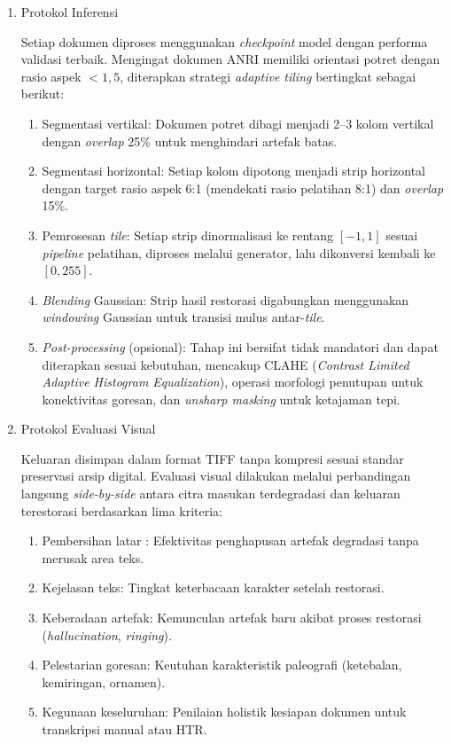 \begin{enumerate}[leftmargin=1.5em, labelsep=0.5em, itemindent=0pt, label=\arabic*., topsep=0pt, partopsep=0pt]
    \item Protokol Inferensi

    Setiap dokumen diproses menggunakan \textit{checkpoint} model dengan performa validasi terbaik. Mengingat dokumen ANRI memiliki orientasi potret dengan rasio aspek $< 1{,}5$, diterapkan strategi \textit{adaptive tiling} bertingkat sebagai berikut:
    \begin{enumerate}[label=\alph*., leftmargin=1.5em, labelsep=0.5em, itemindent=0pt, noitemsep, topsep=0pt]
        \item Segmentasi vertikal: Dokumen potret dibagi menjadi 2--3 kolom vertikal dengan \textit{overlap} 25\% untuk menghindari artefak batas.
        \item Segmentasi horizontal: Setiap kolom dipotong menjadi strip horizontal dengan target rasio aspek 6:1 (mendekati rasio pelatihan 8:1) dan \textit{overlap} 15\%.
        \item Pemrosesan \textit{tile}: Setiap strip dinormalisasi ke rentang $[-1, 1]$ sesuai \textit{pipeline} pelatihan, diproses melalui generator, lalu dikonversi kembali ke $[0, 255]$.
        \item \textit{Blending} Gaussian: Strip hasil restorasi digabungkan menggunakan \textit{windowing} Gaussian untuk transisi mulus antar-\textit{tile}.
        \item \textit{Post-processing} (opsional): Tahap ini bersifat tidak mandatori dan dapat diterapkan sesuai kebutuhan, mencakup CLAHE (\textit{Contrast Limited Adaptive Histogram Equalization}), operasi morfologi penutupan untuk konektivitas goresan, dan \textit{unsharp masking} untuk ketajaman tepi.
    \end{enumerate}

    \item Protokol Evaluasi Visual

    Keluaran disimpan dalam format TIFF tanpa kompresi sesuai standar preservasi arsip digital. Evaluasi visual dilakukan melalui perbandingan langsung \textit{side-by-side} antara citra masukan terdegradasi dan keluaran terestorasi berdasarkan lima kriteria:
    \begin{enumerate}[label=\alph*., leftmargin=1.5em, labelsep=0.5em, itemindent=0pt, noitemsep, topsep=0pt]
        \item Pembersihan latar : Efektivitas penghapusan artefak degradasi tanpa merusak area teks.
        \item Kejelasan teks: Tingkat keterbacaan karakter setelah restorasi.
        \item Keberadaan artefak: Kemunculan artefak baru akibat proses restorasi (\textit{hallucination}, \textit{ringing}).
        \item Pelestarian goresan: Keutuhan karakteristik paleografi (ketebalan, kemiringan, ornamen).
        \item Kegunaan keseluruhan: Penilaian holistik kesiapan dokumen untuk transkripsi manual atau HTR.
    \end{enumerate}
\end{enumerate}



